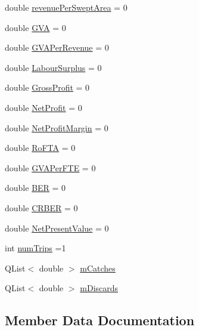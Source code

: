 \begin{DoxyCompactItemize}
\item 
double \mbox{\hyperlink{class_vessel_stats_a5100ac3b7acaf24c2c3e469ce38add36}{revenue\+Per\+Swept\+Area}} = 0
\item 
double \mbox{\hyperlink{class_vessel_stats_af0da4989bb260c1e105b47a2f1095c5a}{G\+VA}} = 0
\item 
double \mbox{\hyperlink{class_vessel_stats_acfa9587d9234176c7ba927447eca7e91}{G\+V\+A\+Per\+Revenue}} = 0
\item 
double \mbox{\hyperlink{class_vessel_stats_ae4a9146176315b04225d36a1f261d6aa}{Labour\+Surplus}} = 0
\item 
double \mbox{\hyperlink{class_vessel_stats_afdc295e907bac07066a6702dd027ea2d}{Gross\+Profit}} = 0
\item 
double \mbox{\hyperlink{class_vessel_stats_a29912be8af151248e80b8b15b5e248b6}{Net\+Profit}} = 0
\item 
double \mbox{\hyperlink{class_vessel_stats_a111d6b1ac7b83dddfd961535ef988109}{Net\+Profit\+Margin}} = 0
\item 
double \mbox{\hyperlink{class_vessel_stats_af9ce43ed5b3e2cac1fb04c4e8dd7c8ae}{Ro\+F\+TA}} = 0
\item 
double \mbox{\hyperlink{class_vessel_stats_a6b52466b01c86315efa2b35565596dfc}{G\+V\+A\+Per\+F\+TE}} = 0
\item 
double \mbox{\hyperlink{class_vessel_stats_a590fc7545c20fa1409201677dc0cf1d1}{B\+ER}} = 0
\item 
double \mbox{\hyperlink{class_vessel_stats_a60cdc28ae85b7b80929299531661b2f1}{C\+R\+B\+ER}} = 0
\item 
double \mbox{\hyperlink{class_vessel_stats_aa7d13584bfd63c3ef7e7868473642b81}{Net\+Present\+Value}} = 0
\item 
int \mbox{\hyperlink{class_vessel_stats_a15fcc8a139f7cbcc95c86d481dbe8fb5}{num\+Trips}} =1
\item 
Q\+List$<$ double $>$ \mbox{\hyperlink{class_vessel_stats_a31202ee008f6be63ab23d709ad1100f6}{m\+Catches}}
\item 
Q\+List$<$ double $>$ \mbox{\hyperlink{class_vessel_stats_aff96b64b52d08ec6e2d0ed07d3bb3202}{m\+Discards}}
\end{DoxyCompactItemize}


\subsection{Member Data Documentation}
\mbox{\label{class_vessel_stats_a590fc7545c20fa1409201677dc0cf1d1}} 
